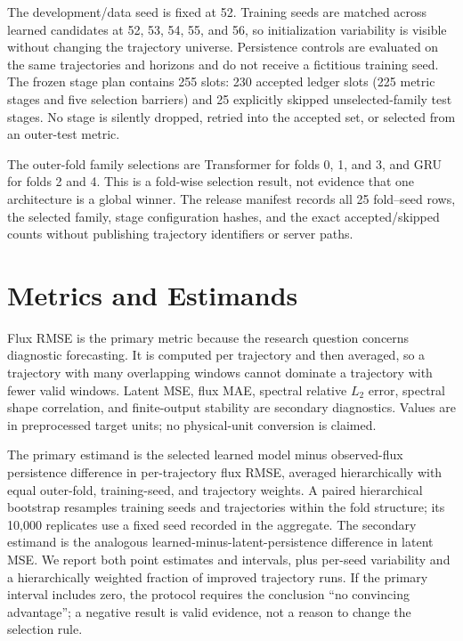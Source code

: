 The development/data seed is fixed at 52. Training seeds are matched across learned candidates at
52, 53, 54, 55, and 56, so initialization variability is visible without changing the trajectory
universe. Persistence controls are evaluated on the same trajectories and horizons and do not
  receive a fictitious training seed. The frozen stage plan contains 255 slots: 230 accepted
  ledger slots (225 metric stages and five selection barriers) and 25 explicitly skipped
  unselected-family test stages. No stage is silently
dropped, retried into the accepted set, or selected from an outer-test metric.

The outer-fold family selections are Transformer for folds 0, 1, and 3, and GRU for folds 2 and
4. This is a fold-wise selection result, not evidence that one architecture is a global winner.
The release manifest records all 25 fold--seed rows, the selected family, stage configuration
hashes, and the exact accepted/skipped counts without publishing trajectory identifiers or server
paths.

\section{Metrics and Estimands}

Flux RMSE is the primary metric because the research question concerns diagnostic forecasting. It
is computed per trajectory and then averaged, so a trajectory with many overlapping windows cannot
dominate a trajectory with fewer valid windows. Latent MSE, flux MAE, spectral relative $L_2$ error,
spectral shape correlation, and finite-output stability are secondary diagnostics. Values are in
preprocessed target units; no physical-unit conversion is claimed.

The primary estimand is the selected learned model minus observed-flux persistence difference in
per-trajectory flux RMSE, averaged hierarchically with equal outer-fold, training-seed, and
trajectory weights. A paired hierarchical bootstrap \citep{saravanan2020hierarchical} resamples training seeds and trajectories
within the fold structure; its 10,000 replicates use a fixed seed recorded in the aggregate. The
secondary estimand is the analogous learned-minus-latent-persistence difference in latent MSE.
We report both point estimates and intervals, plus per-seed variability and a hierarchically
weighted fraction of improved trajectory runs. If the primary interval includes zero, the protocol
requires the conclusion ``no convincing advantage''; a negative result is valid evidence, not a
reason to change the selection rule.


